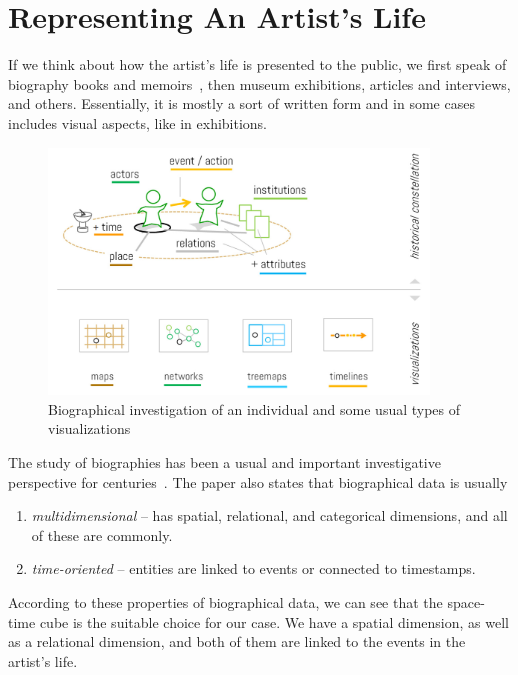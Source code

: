 \section{Representing An Artist's Life}\label{sec:representing-artists-life}
If we think about how the artist’s life is presented to the public, we first speak of biography books and memoirs~\citep{isaacson2017leonardo,
    tomkins1999duchamp, herrera1983frida}, then museum exhibitions, articles and interviews, and others. Essentially, it is mostly a sort of
written form and in some cases includes visual aspects, like in exhibitions.

\begin{figure}[h!]
    \begin{center}
        \includegraphics[width=0.9\textwidth]{graphics/2-literature-review/22}
    \end{center}
    \caption{Biographical investigation of an individual and some usual types of visualizations~\citep{windhager2017synoptic}}
    \label{fig:figure2.22}
\end{figure}

The study of biographies has been a usual and important investigative perspective for centuries~\citep{windhager2017synoptic}. The paper also
states that biographical data is usually
\begin{enumerate}
    \item \emph{multidimensional} -- has spatial, relational, and categorical dimensions, and all of these are commonly.
    \item \emph{time-oriented} -- entities are linked to events or connected to timestamps.
\end{enumerate}

According to these properties of biographical data, we can see that the space-time cube is the suitable choice for our case. We have a
spatial dimension, as well as a relational dimension, and both of them are linked to the events in the artist’s life.

